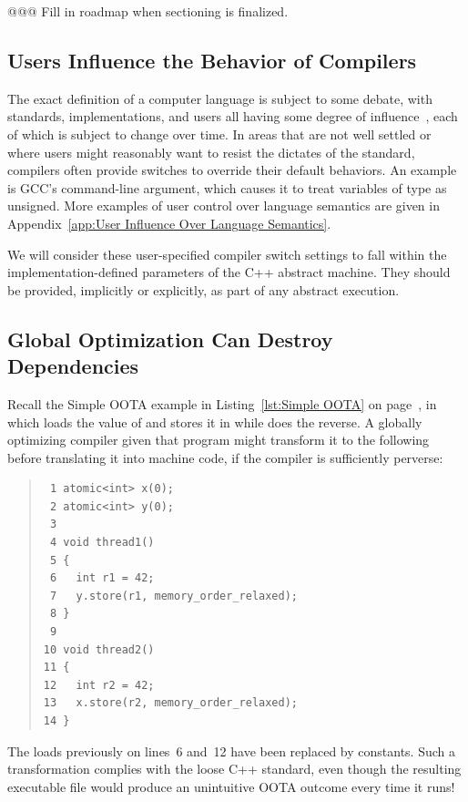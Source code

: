 \documentclass[10]{article}
\begin{document}
@@@ Fill in roadmap when sectioning is finalized.

\subsection{Users Influence the Behavior of Compilers}
\label{sec:Users Influence the Behavior of Compilers}

The exact definition of a computer language is subject to some debate,
with standards, implementations, and users all having some degree of
influence~\cite{KayvanMemarian2016DepthOfC-1,KayvanMemarian2016DepthOfC-2},
each of which is subject to change over time.
In areas that are not well settled or where users might reasonably
want to resist the dictates of the standard,
compilers often provide switches to override their default behaviors.
An example is GCC's  command-line argument,
which causes it to treat variables of type  as unsigned.
More examples of user control over language semantics are given in
Appendix~\ref{app:User Influence Over Language Semantics}.

We will consider these user-specified compiler switch settings to fall
within the implementation-defined parameters of the C++ abstract machine.
They should be provided, implicitly or explicitly, as part of any
abstract execution.

\subsection{Global Optimization Can Destroy Dependencies}
\label{sec:Global Optimization Can Destroy Dependencies}

Recall the Simple OOTA example in Listing~\ref{lst:Simple OOTA} on
page~\pageref{lst:Simple OOTA},
in which  loads the value of  and stores it in
 while  does the reverse.
A globally optimizing compiler given that program might
transform it to the following before translating it into machine code,
if the compiler is sufficiently perverse:
\begin{quote}
\begin{verbatim}
 1 atomic<int> x(0);
 2 atomic<int> y(0);
 3
 4 void thread1()
 5 {
 6   int r1 = 42;
 7   y.store(r1, memory_order_relaxed);
 8 }
 9
10 void thread2()
11 {
12   int r2 = 42;
13   x.store(r2, memory_order_relaxed);
14 }
\end{verbatim}
\end{quote}
The loads previously on lines~6 and~12 have been replaced by constants.
Such a transformation complies with the loose C++ standard,
even though the resulting executable file would produce an unintuitive
OOTA outcome every time it runs!
\end{document}
